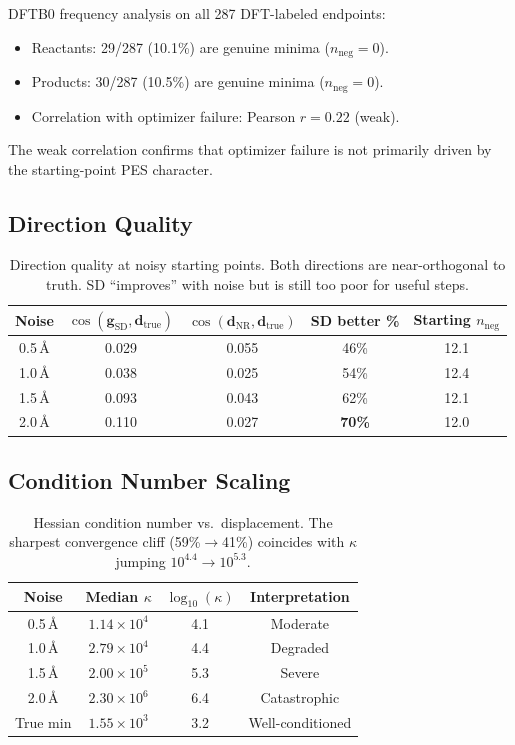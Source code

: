 \documentclass[11pt,a4paper]{article}
\newcommand{\vect}[1]{\bm{#1}}
\theoremstyle{definition}
\begin{document}
DFTB0 frequency analysis on all 287 DFT-labeled endpoints:
\begin{itemize}[nosep]
  \item Reactants: 29/287 (10.1\%) are genuine minima ($n_\text{neg}=0$).
  \item Products: 30/287 (10.5\%) are genuine minima ($n_\text{neg}=0$).
  \item Correlation with optimizer failure: Pearson $r=0.22$ (weak).
\end{itemize}
The weak correlation confirms that optimizer failure is not primarily
driven by the starting-point PES character.

\subsection{Direction Quality}
\label{sec:direction-quality}

\begin{table}[h]
\centering
\begin{tabular}{ccccc}
\toprule
Noise & $\cos(\vect{g}_\text{SD}, \vect{d}_\text{true})$ & $\cos(\vect{d}_\text{NR}, \vect{d}_\text{true})$ & SD better \% & Starting $n_\text{neg}$ \\
\midrule
0.5\,\AA & 0.029 & 0.055 & 46\% & 12.1 \\
1.0\,\AA & 0.038 & 0.025 & 54\% & 12.4 \\
1.5\,\AA & 0.093 & 0.043 & 62\% & 12.1 \\
2.0\,\AA & 0.110 & 0.027 & \textbf{70\%} & 12.0 \\
\bottomrule
\end{tabular}
\caption{Direction quality at noisy starting points.  Both directions are
  near-orthogonal to truth.  SD ``improves'' with noise but is still too poor
  for useful steps.}
\label{tab:direction-quality}
\end{table}

\subsection{Condition Number Scaling}

\begin{table}[h]
\centering
\begin{tabular}{cccc}
\toprule
Noise & Median $\kappa$ & $\log_{10}(\kappa)$ & Interpretation \\
\midrule
0.5\,\AA & $1.14\times10^4$ & 4.1 & Moderate \\
1.0\,\AA & $2.79\times10^4$ & 4.4 & Degraded \\
1.5\,\AA & $2.00\times10^5$ & 5.3 & Severe \\
2.0\,\AA & $2.30\times10^6$ & 6.4 & Catastrophic \\
True min & $1.55\times10^3$ & 3.2 & Well-conditioned \\
\bottomrule
\end{tabular}
\caption{Hessian condition number vs.\ displacement.  The sharpest convergence
  cliff (59\%$\to$41\%) coincides with $\kappa$ jumping
  $10^{4.4}\to10^{5.3}$.}
\label{tab:condition}
\end{table}
\end{document}
